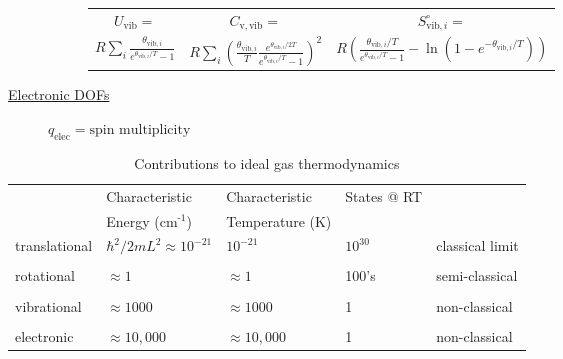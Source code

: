 \documentclass[11pt]{article}
\begin{document}
\begin{table}
\begin{center}
\begin{description}
\begin{description}
\begin{tabular}{ccc}
$ U_\mathrm{vib}= $ & $  C_\mathrm{v,vib} = $ & $S^\circ_{\mathrm{vib},i}=$ \\
$\displaystyle
R\sum_i\frac{\theta_{\mathrm{vib},i}}{e^{\theta_{\mathrm{vib},i}/T}-1}$ &
$\displaystyle R \sum_i \left (
  \frac{\theta_{\mathrm{vib},i}}{T}\frac{e^{\theta_{\mathrm{vib},i}/2T}}{e^{\theta_{\mathrm{vib},i}/T}-1}
\right )^2 $ & $\displaystyle R \left ( \frac{\theta_{\mathrm{vib},i}/T}{e^{\theta_{\mathrm{vib},i}/T}-1}
-\ln(1-e^{-\theta_{\mathrm{vib},i}/T})\right ) $ \\
\end{tabular}

\end{description}
\item[\underline{Electronic DOFs}] {}
$q_\mathrm{elec} = \text{spin multiplicity}$


\end{description}
\end{center}
\end{table}

\begin{table}[htbp]
\caption{Contributions to ideal gas thermodynamics}
\centering
\begin{tabular}{lllll}
\hline
 & Characteristic & Characteristic & States @ RT & \\
 & Energy (cm\(^{\text{-1}}\)) & Temperature (K) &  & \\
\hline
translational & \(\hbar^2/2 m L^2 \approx 10^{-21}\) & \(10^{-21}\) & \(10^{30}\) & classical limit\\
 &  &  &  & \\
rotational & \(\approx 1\) & \(\approx 1\) & 100's & semi-classical\\
 &  &  &  & \\
vibrational & \(\approx 1000\) & \(\approx 1000\) & 1 & non-classical\\
 &  &  &  & \\
electronic & \(\approx 10,000\) & \(\approx 10,000\) & 1 & non-classical\\
\hline
\end{tabular}
\end{table}
\end{document}
